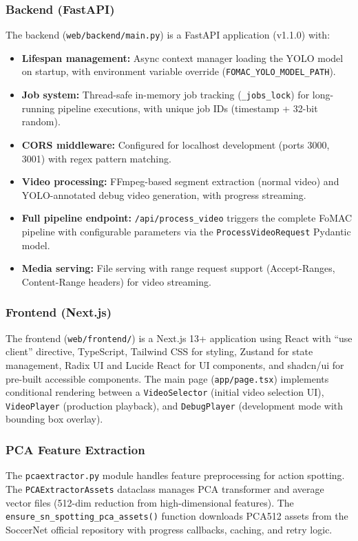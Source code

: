 \documentclass[10pt,twocolumn,a4paper]{article}
\begin{document}
\subsubsection{Backend (FastAPI)}
The backend (\texttt{web/backend/main.py}) is a FastAPI application (v1.1.0) with:
\begin{itemize}[noitemsep,topsep=0pt]
  \item \textbf{Lifespan management:} Async context manager loading the YOLO model on startup, with environment variable override (\texttt{FOMAC\_YOLO\_MODEL\_PATH}).
  \item \textbf{Job system:} Thread-safe in-memory job tracking (\texttt{\_jobs\_lock}) for long-running pipeline executions, with unique job IDs (timestamp + 32-bit random).
  \item \textbf{CORS middleware:} Configured for localhost development (ports 3000, 3001) with regex pattern matching.
  \item \textbf{Video processing:} FFmpeg-based segment extraction (normal video) and YOLO-annotated debug video generation, with progress streaming.
  \item \textbf{Full pipeline endpoint:} \texttt{/api/process\_video} triggers the complete FoMAC pipeline with configurable parameters via the \texttt{ProcessVideoRequest} Pydantic model.
  \item \textbf{Media serving:} File serving with range request support (Accept-Ranges, Content-Range headers) for video streaming.
\end{itemize}

\subsubsection{Frontend (Next.js)}
The frontend (\texttt{web/frontend/}) is a Next.js 13+ application using React with ``use client'' directive, TypeScript, Tailwind CSS for styling, Zustand for state management, Radix UI and Lucide React for UI components, and shadcn/ui for pre-built accessible components. The main page (\texttt{app/page.tsx}) implements conditional rendering between a \texttt{VideoSelector} (initial video selection UI), \texttt{VideoPlayer} (production playback), and \texttt{DebugPlayer} (development mode with bounding box overlay).

\subsubsection{PCA Feature Extraction}
The \texttt{pcaextractor.py} module handles feature preprocessing for action spotting. The \texttt{PCAExtractorAssets} dataclass manages PCA transformer and average vector files (512-dim reduction from high-dimensional features). The \texttt{ensure\_sn\_spotting\_pca\_assets()} function downloads PCA512 assets from the SoccerNet official repository with progress callbacks, caching, and retry logic.
\end{document}
